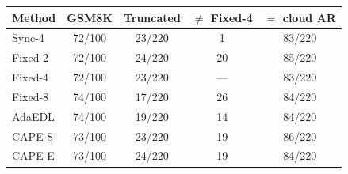 \begin{tabular}{@{}lcccc@{}}
\toprule
Method & GSM8K & Truncated & $\neq$ Fixed-4 & $=$ cloud AR\\
\midrule
Sync-4 & 72/100 & 23/220 & 1 & 83/220 \\
Fixed-2 & 72/100 & 24/220 & 20 & 85/220 \\
Fixed-4 & 72/100 & 23/220 & --- & 83/220 \\
Fixed-8 & 74/100 & 17/220 & 26 & 84/220 \\
AdaEDL & 74/100 & 19/220 & 14 & 84/220 \\
CAPE-S & 73/100 & 23/220 & 19 & 86/220 \\
CAPE-E & 73/100 & 24/220 & 19 & 84/220 \\
\bottomrule
\end{tabular}
